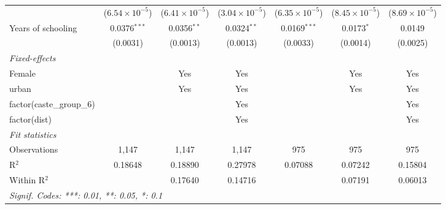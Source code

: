 \begin{table}[htbp]
{\begin{tabular}{lcccccc}
                                   & ($6.54\times 10^{-5}$)  & ($6.41\times 10^{-5}$)  & ($3.04\times 10^{-5}$)  & ($6.35\times 10^{-5}$)  & ($8.45\times 10^{-5}$)  & ($8.69\times 10^{-5}$)\\    
         Years of schooling        & 0.0376$^{***}$          & 0.0356$^{**}$           & 0.0324$^{**}$           & 0.0169$^{***}$          & 0.0173$^{*}$            & 0.0149\\   
                                   & (0.0031)                & (0.0013)                & (0.0013)                & (0.0033)                & (0.0014)                & (0.0025)\\   
         \midrule
         \emph{Fixed-effects}\\
         Female                    &                         & Yes                     & Yes                     &                         & Yes                     & Yes\\  
         urban                     &                         & Yes                     & Yes                     &                         & Yes                     & Yes\\  
         factor(caste\_group\_6)   &                         &                         & Yes                     &                         &                         & Yes\\  
         factor(dist)              &                         &                         & Yes                     &                         &                         & Yes\\  
         \midrule
         \emph{Fit statistics}\\
         Observations              & 1,147                   & 1,147                   & 1,147                   & 975                     & 975                     & 975\\  
         R$^2$                     & 0.18648                 & 0.18890                 & 0.27978                 & 0.07088                 & 0.07242                 & 0.15804\\  
         Within R$^2$              &                         & 0.17640                 & 0.14716                 &                         & 0.07191                 & 0.06013\\  
         \midrule \midrule
         \multicolumn{7}{l}{\emph{Signif. Codes: ***: 0.01, **: 0.05, *: 0.1}}\\
      \end{tabular}}
\end{table}


